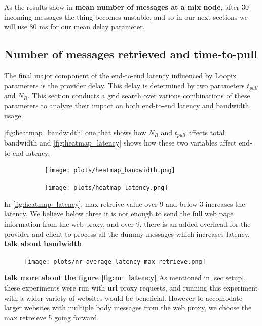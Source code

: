 \documentclass[a4paper,11pt,oneside]{report}
\begin{document}
As the results show in \textbf{mean number of messages at a mix node}, after 30 incoming messages the thing becomes unstable, and so in our next sections we will use 80 ms for our mean delay parameter.

\subsection{Number of messages retrieved and time-to-pull }

The final major component of the end-to-end latency influenced by Loopix parameters is the provider delay. This delay is determined by two parameters \(t_{pull}\) and \(N_R\). This section conducts a grid search over various combinations of these parameters to analyze their impact on both end-to-end latency and bandwidth usage.

\autoref{fig:heatmap_bandwidth} one that shows how \(N_R\) and \(t_{pull}\) affects total bandwidth and \autoref{fig:heatmap_latency} shows how these two variables affect end-to-end latency.

\begin{figure}[H]
    \centering
    \begin{subfigure}{0.49\textwidth}
        \centering
        \texttt{[image: plots/heatmap\_bandwidth.png]}
        \caption{}
        \label{fig:heatmap_bandwidth}
    \end{subfigure}
    \hfill
    \centering
    \begin{subfigure}{0.49\textwidth}
        \centering
        \texttt{[image: plots/heatmap\_latency.png]}
        \caption{}
        \label{fig:heatmap_latency}
    \end{subfigure}
\end{figure}


In \autoref{fig:heatmap_latency}, max retreive value over 9 and below 3 increases the latency. We believe below three it is not enough to send the full web page information from the web proxy, and over 9, there is an added overhead for the provider and client to process all the dummy messages which increases latency. \textbf{talk about bandwidth}


\begin{figure}[H]
    \centering
    \texttt{[image: plots/nr\_average\_latency\_max\_retrieve.png]}
    \caption{}
    \label{fig:nr_latency}
\end{figure}

\textbf{talk more about the figure \autoref{fig:nr_latency}}
As mentioned in \autoref{sec:setup}, these experiments were run with \textbf{url} proxy requests, and running this experiment with a wider variety of websites would be beneficial. However to accomodate larger websites with multiple body messages from the web proxy, we choose the max retreieve 5 going forward. 
\end{document}
